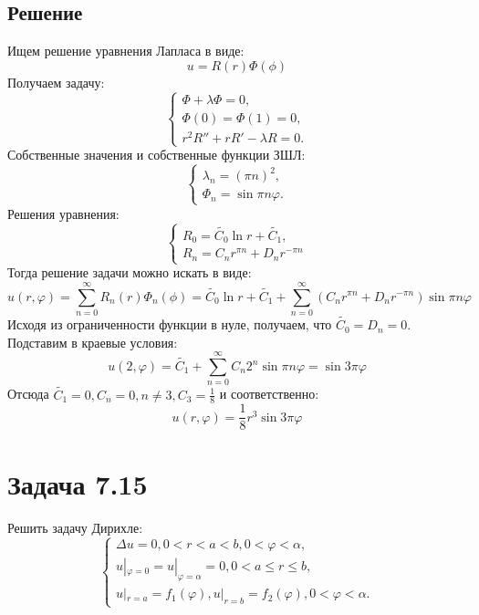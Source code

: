 \documentclass[11pt]{article}
\begin{document}
\subsection{Решение}
\label{sec:orgaf69506}
Ищем решение уравнения Лапласа в виде:
\begin{equation*}
u = R(r)\Phi(\phi)
\end{equation*}
Получаем задачу:
\begin{equation*}
\begin{cases}
\Phi + \lambda\Phi = 0, \\
\Phi(0) = \Phi(1) = 0, \\
r^2R'' + rR' - \lambda R = 0.
\end{cases}
\end{equation*}
Собственные значения и собственные функции ЗШЛ:
\begin{equation*}
\begin{cases}
\lambda_n = (\pi n)^2, \\
\Phi_n = \sin\pi n\varphi.
\end{cases}
\end{equation*}
Решения уравнения:
\begin{equation*}
\begin{cases}
R_0 = \tilde{C_0}\ln r + \tilde{C_1}, \\
R_n = C_nr^{\pi n} + D_nr^{-\pi n}
\end{cases}
\end{equation*}
Тогда решение задачи можно искать в виде:
\begin{equation*}
u(r, \varphi) = \sum_{n = 0}^{\infty}R_n(r)\Phi_n(\phi) = \tilde{C_0}\ln r + \tilde{C_1} +
\sum_{n = 0}^{\infty}(C_nr^{\pi n} + D_nr^{-\pi n})\sin\pi n\varphi
\end{equation*}
Исходя из ограниченности функции в нуле, получаем, что $\tilde{C_0} = D_n = 0$. Подставим в
краевые условия:
\begin{equation*}
u(2, \varphi) = \tilde{C_1} + \sum_{n = 0}^{\infty}C_n2^n\sin\pi n\varphi = \sin3\pi\varphi
\end{equation*}
Отсюда $\tilde{C_1} = 0, C_n = 0, n \neq 3, C_3 = \frac18$ и соответственно:
\begin{equation}
u(r, \varphi) = \frac18r^3\sin3\pi\varphi
\end{equation}
\section{Задача 7.15}
\label{sec:org47dcb7e}
Решить задачу Дирихле:
\begin{equation}
\begin{cases}
\Delta u = 0, 0 < r < a < b, 0 < \varphi < \alpha, \\
u|_{\varphi = 0} = u|_{\varphi = \alpha} = 0, 0 < a \leq r \leq b, \\
u|_{r = a} = f_1(\varphi), u|_{r = b} = f_2(\varphi), 0 < \varphi < \alpha.
\end{cases}
\end{equation}
\end{document}

